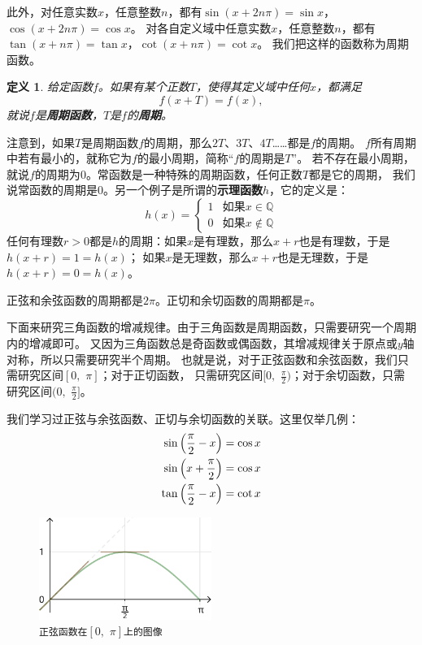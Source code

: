 \documentclass[12pt,UTF8]{ctexbook}
\newtheorem{df}{定义}[section]
\begin{document}
此外，对任意实数$x$，任意整数$n$，都有$\sin(x+2n\pi) = \sin{x}$，$\cos(x+2n\pi) = \cos{x}$。
对各自定义域中任意实数$x$，任意整数$n$，都有$\tan(x+n\pi) = \tan{x}$，$\cot(x+n\pi) = \cot{x}$。
我们把这样的函数称为周期函数。
\begin{df}
    给定函数$f$。如果有某个正数$T$，使得其定义域中任何$x$，都满足
    $$ f(x + T) = f(x),$$
    就说$f$是\textbf{周期函数}，$T$是$f$的\textbf{周期}。
\end{df}
注意到，如果$T$是周期函数$f$的周期，那么$2T$、$3T$、$4T$……都是$f$的周期。
$f$所有周期中若有最小的，就称它为$f$的最小周期，简称“$f$的周期是$T$”。
若不存在最小周期，就说$f$的周期为$0$。常函数是一种特殊的周期函数，任何正数$T$都是它的周期，
我们说常函数的周期是$0$。另一个例子是所谓的\textbf{示理函数}$h$，它的定义是：
$$
h(x) = \left\{
        \begin{array}{cc}
        1 & \mbox{如果}x\in\mathbb{Q} \\
        0 & \mbox{如果}x\notin\mathbb{Q} 
        \end{array}
    \right.
$$
任何有理数$r>0$都是$h$的周期：如果$x$是有理数，那么$x+r$也是有理数，于是$h(x+r) = 1 = h(x)$；
如果$x$是无理数，那么$x+r$也是无理数，于是$h(x+r) = 0 = h(x)$。

正弦和余弦函数的周期都是$2\pi$。正切和余切函数的周期都是$\pi$。

下面来研究三角函数的增减规律。由于三角函数是周期函数，只需要研究一个周期内的增减即可。
又因为三角函数总是奇函数或偶函数，其增减规律关于原点或$y$轴对称，所以只需要研究半个周期。
也就是说，对于正弦函数和余弦函数，我们只需研究区间$[0, \,\,\pi]$；对于正切函数，
只需研究区间$[0, \,\,\frac{\pi}{2})$；对于余切函数，只需研究区间$(0, \,\,\frac{\pi}{2}]$。

我们学习过正弦与余弦函数、正切与余切函数的关联。这里仅举几例：
\begin{align}
    \sin{\left(\frac{\pi}{2} - x\right)} &= \cos{x} \notag \\
    \sin{\left(x + \frac{\pi}{2}\right)} &= \cos{x} \notag \\
    \tan{\left(\frac{\pi}{2} - x\right)} &= \cot{x} \notag     
\end{align}

\begin{figure} %
    \vspace{-35pt}
    \flushright
    \includegraphics[width=0.5\textwidth]{三角函数2.png}
    \caption*{\texttt{正弦函数在}$[0,\,\,\pi]$\texttt{上的图像}}
\end{figure}
\end{document}
